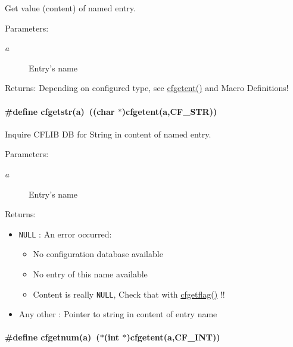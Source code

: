 Get value (content) of named entry. 

\begin{Desc}
\item[Parameters:]
\begin{description}
\item[{\em a}]Entry's name\end{description}
\end{Desc}
\begin{Desc}
\item[Returns:]Depending on configured type, see \hyperlink{group__retrieval_g872f83b13a8f722176f5e299f2a42e0f}{cfgetent()} and Macro Definitions! \end{Desc}
\hypertarget{group__retrieval_g8cf5f53c5b05ec5ca4f5145010f84eb4}{
\paragraph[{cfgetstr}]{\setlength{\rightskip}{0pt plus 5cm}\#define cfgetstr(a)~((char $\ast$)cfgetent(a,CF\_\-STR))}\hfill}
\label{group__retrieval_g8cf5f53c5b05ec5ca4f5145010f84eb4}


Inquire CFLIB DB for String in content of named entry. 

\begin{Desc}
\item[Parameters:]
\begin{description}
\item[{\em a}]Entry's name\end{description}
\end{Desc}
\begin{Desc}
\item[Returns:]\begin{itemize}
\item {\tt NULL} : An error occurred:\begin{itemize}
\item No configuration database available\item No entry of this name available\item Content is really {\tt NULL}, Check that with \hyperlink{group__retrieval_gc0188464b59267e14b5c44efb1d4a0f2}{cfgetflag()} !!\end{itemize}
\end{itemize}
\begin{itemize}
\item Any other : Pointer to string in content of entry name \end{itemize}
\end{Desc}
\hypertarget{group__retrieval_g591b741a05205e1ddd599146b996d755}{
\paragraph[{cfgetnum}]{\setlength{\rightskip}{0pt plus 5cm}\#define cfgetnum(a)~($\ast$(int $\ast$)cfgetent(a,CF\_\-INT))}\hfill}
\label{group__retrieval_g591b741a05205e1ddd599146b996d755}



